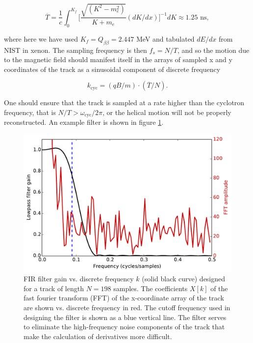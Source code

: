 \documentclass{JINST}
\begin{document}
\begin{equation}\label{eqn_T}
\overline{T} = \frac{1}{c}\int_{0}^{K_{f}} \biggl[\frac{\sqrt{(K^2-m_e^2)}}{K+m_e}(dK/dx)\biggr]^{-1} dK \approx 1.25 \,\, \mathrm{ns},
\end{equation}

\noindent where here we have used $K_{f} = Q_{\beta\beta} = 2.447$ MeV and tabulated 
$dE/dx$ from NIST \cite{NIST_mac} in xenon.  The sampling frequency is then $f_{s} = N/T$, and so the motion
due to the magnetic field should manifest itself in the arrays of sampled x and y coordinates
of the track as a sinusoidal component of discrete frequency 

\begin{equation}\label{eqn_kcyc}
k_{\mathrm{cyc}} = (qB/m)\cdot(\overline{T}/N).
\end{equation}

\noindent One should ensure that the track is sampled at a rate higher than the cyclotron
frequency, that is $N/T > \omega_{\mathrm{cyc}}/2\pi$, or the helical motion will not be properly
reconstructed.  An example filter is shown in figure \ref{fig_FIR}.  

\begin{figure}[!htb]
	\centering
	\includegraphics[scale=0.6]{fig/FIR_freq_resp_nmagse2_6.pdf}
	\caption{\label{fig_FIR}FIR filter gain vs. discrete frequency $k$ (solid black curve) designed for a track of length $N = 198$ samples.  The coefficients $X[k]$ of the fast fourier transform (FFT) of the x-coordinate array of the track are shown vs. discrete frequency in red.  The cutoff frequency used in designing the filter is shown as a blue vertical line.  The filter serves to eliminate the high-frequency noise components of the track that make the calculation of derivatives more difficult.}
\end{figure}
\end{document}
